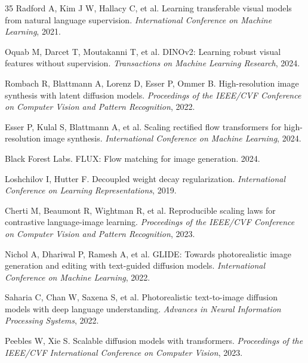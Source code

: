 \documentclass[times,twocolumn,final]{elsarticle}
\begin{document}
\begin{thebibliography}{35}
Radford A, Kim J W, Hallacy C, et al. Learning transferable visual models from natural language supervision. \textit{International Conference on Machine Learning}, 2021.

Oquab M, Darcet T, Moutakanni T, et al. DINOv2: Learning robust visual features without supervision. \textit{Transactions on Machine Learning Research}, 2024.

Rombach R, Blattmann A, Lorenz D, Esser P, Ommer B. High-resolution image synthesis with latent diffusion models. \textit{Proceedings of the IEEE/CVF Conference on Computer Vision and Pattern Recognition}, 2022.

Esser P, Kulal S, Blattmann A, et al. Scaling rectified flow transformers for high-resolution image synthesis. \textit{International Conference on Machine Learning}, 2024.

Black Forest Labs. FLUX: Flow matching for image generation. 2024.

Loshchilov I, Hutter F. Decoupled weight decay regularization. \textit{International Conference on Learning Representations}, 2019.

Cherti M, Beaumont R, Wightman R, et al. Reproducible scaling laws for contrastive language-image learning. \textit{Proceedings of the IEEE/CVF Conference on Computer Vision and Pattern Recognition}, 2023.

Nichol A, Dhariwal P, Ramesh A, et al. GLIDE: Towards photorealistic image generation and editing with text-guided diffusion models. \textit{International Conference on Machine Learning}, 2022.

Saharia C, Chan W, Saxena S, et al. Photorealistic text-to-image diffusion models with deep language understanding. \textit{Advances in Neural Information Processing Systems}, 2022.

Peebles W, Xie S. Scalable diffusion models with transformers. \textit{Proceedings of the IEEE/CVF International Conference on Computer Vision}, 2023.

\end{thebibliography}
\end{document}
